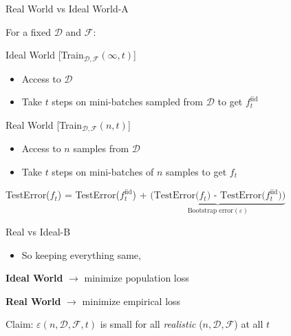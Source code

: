 \documentclass[aspectratio=169]{beamer}
\begin{document}
\begin{frame}{Real World vs Ideal World-A}

For a fixed $\mathcal{D}$ and $\mathcal{F}$:

\centering 
\begin{minipage}{0.4\textwidth}
	\begin{block}{\color{White}Ideal World [Train$_{\mathcal{D,F}}(\infty ,t)$]}
		\begin{itemize}
			\item Access to $\mathcal{D}$
			\item Take $t$ steps on mini-batches sampled from $\mathcal{D}$ to get $f_t^\text{iid}$
		\end{itemize}
	\end{block}	
\end{minipage}%
\hspace{1cm}
\begin{minipage}{0.4\textwidth}
		\begin{block}{\color{White}Real World [Train$_{\mathcal{D,F}}(n,t)$]}
		\begin{itemize}
			\item Access to $n$ samples from $\mathcal{D}$
			\item Take $t$ steps on mini-batches of $n$ samples to get $f_t$
		\end{itemize}
	\end{block}
\end{minipage}

\vspace{1cm}
\centering
	TestError($f_t$) = TestError($f_t^{\text{iid}}$) + $\underbrace{\text{(TestError($f_t$) - TestError($f_t^{\text{iid}}$))}}_{\text{Bootstrap error} (\varepsilon)}$
\end{frame}

\begin{frame}{Real vs Ideal-B}
	\begin{itemize}
		\item So keeping everything same,
	\end{itemize}
		\centering
		\textbf{Ideal World} $\to$ minimize population loss
		
		\textbf{Real World} $\to$ minimize empirical loss
		
		\vspace{1cm}
		\color{Pink} Claim: \color{Black} $\varepsilon(n,\mathcal{D,F},t)$ is small for all \textit{realistic} ($n,\mathcal{D,F}$) at all $t$
\end{frame}
\end{document}
